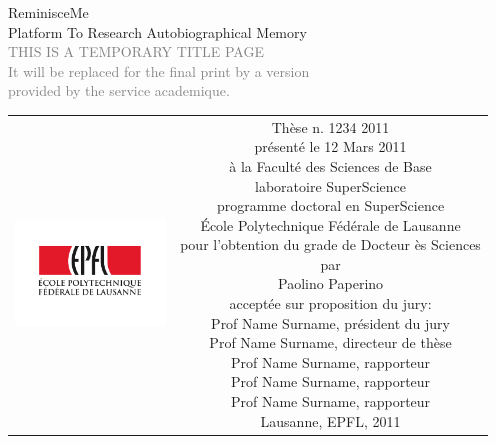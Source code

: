 \begin{titlepage}
\begin{center}
\sffamily


\null\vspace{2cm}
{\huge ReminisceMe \\[12pt] Platform To Research Autobiographical Memory} \\[24pt] 
\textcolor{gray}{\small{THIS IS A TEMPORARY TITLE PAGE \\ It will be replaced for the final print by a version \\ provided by the service academique.}}
    
\vfill

\begin{tabular} {cc}
\parbox{0.3\textwidth}{\includegraphics[width=4cm]{images/epfl}}
&
\parbox{0.7\textwidth}{%
	Thèse n. 1234 2011\\
	présenté le 12 Mars 2011\\
	à la Faculté des Sciences de Base\\
	laboratoire SuperScience\\
	programme doctoral en SuperScience\\
%
	École Polytechnique Fédérale de Lausanne\\[6pt]
	pour l'obtention du grade de Docteur ès Sciences\\
	par\\ [4pt]
	\null \hspace{3em} Paolino Paperino\\[9pt]
%
\small
acceptée sur proposition du jury:\\[4pt]
%
    Prof Name Surname, président du jury\\
    Prof Name Surname, directeur de thèse\\
    Prof Name Surname, rapporteur\\
    Prof Name Surname, rapporteur\\
    Prof Name Surname, rapporteur\\[12pt]
%
Lausanne, EPFL, 2011}
\end{tabular}
\end{center}
\vspace{2cm}
\end{titlepage}



